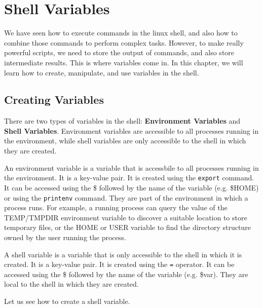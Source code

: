 \chapter{Shell Variables}

We have seen how to execute commands in the linux shell, and also how to
combine those commands to perform complex tasks. However, to make really
powerful scripts, we need to store the output of commands, and also store
intermediate results. This is where variables come in. In this chapter,
we will learn how to create, manipulate, and use variables in the shell.

\section{Creating Variables}

There are two types of variables in the shell: \textbf{Environment Variables}
and \textbf{Shell Variables}. Environment variables are accessible to all
processes running in the environment, while shell variables are only accessible
to the shell in which they are created.

\begin{definition}
  An environment variable is a variable that is accessbile to all
  processes running in the environment. It is a key-value pair.
  It is created using the \lstinline{export} command. It can be accessed
  using the \$ followed by the name of the variable (e.g. \$HOME) or
  using the \lstinline{printenv} command.
  They are part of the environment in which a process runs. For example,
  a running process can query the value of the
  TEMP/TMPDIR environment variable to discover a suitable location to store
  temporary files, or the HOME or USER variable
  to find the directory structure owned by the user running the process.
\end{definition}

\begin{definition}
  A shell variable is a variable that is only accessible to the shell
  in which it is created. It is a key-value pair. It is created using
  the \lstinline{=} operator. It can be accessed using the \$ followed by the name
  of the variable (e.g. \$var).
  They are local to the shell in which they are created.
\end{definition}

Let us see how to create a shell variable.


